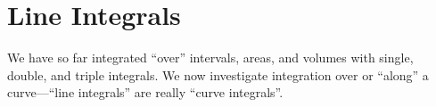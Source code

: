 \section{Line Integrals}\label{sec:LineIntegrals}

We have so far integrated ``over'' intervals, areas, and volumes with
single, double, and triple integrals. We now investigate integration
over or ``along'' a curve---``line integrals''
are really ``curve integrals''.






